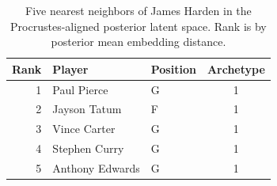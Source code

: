 \begin{table}[htbp]
  \centering\small
  \begin{tabular}{rllc}
    \toprule
    Rank & Player & Position & Archetype \\
    \midrule
    1 & Paul Pierce & G & 1 \\
    2 & Jayson Tatum & F & 1 \\
    3 & Vince Carter & G & 1 \\
    4 & Stephen Curry & G & 1 \\
    5 & Anthony Edwards & G & 1 \\
    \bottomrule
  \end{tabular}
  \caption{Five nearest neighbors of James Harden in the Procrustes-aligned posterior latent space. Rank is by posterior mean embedding distance.}
  \label{tab:James_Harden_neighbors}
\end{table}

